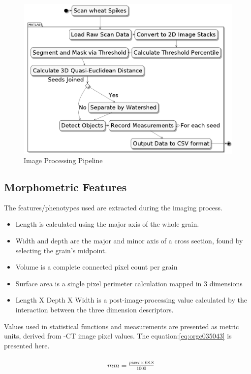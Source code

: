 \documentclass[11pt]{report}
\begin{document}
\begin{figure}[htbp]
\centering
\includegraphics[width=15cm]{./images/matlab.png}
\caption{\label{fig:org2ce6f44}
Image Processing Pipeline}
\end{figure}

\subsection{Morphometric Features}
\label{sec:org609a8a5}

The features/phenotypes used are extracted during the imaging process.
\begin{itemize}
\item Length is calculated using the major axis of the whole grain.
\item Width and depth are the major and minor axis of a cross section, found by selecting the grain's midpoint.
\item Volume is a complete connected pixel count per grain
\item Surface area is a single pixel perimeter calculation mapped in 3 dimensions
\item Length X Depth X Width is a post-image-processing value calculated by the interaction between the three dimension descriptors.
\end{itemize}

Values used in statistical functions and measurements are presented as metric units, derived from \textmu{}-CT image pixel values. The equation:\ref{eq:orgc035043} is presented here.

\begin{align}
\label{eq:orgc035043}
  &\begin{aligned}
mm = \frac{pixel \times 68.8}{1000}
  \end{aligned}
\end{align}
\end{document}
